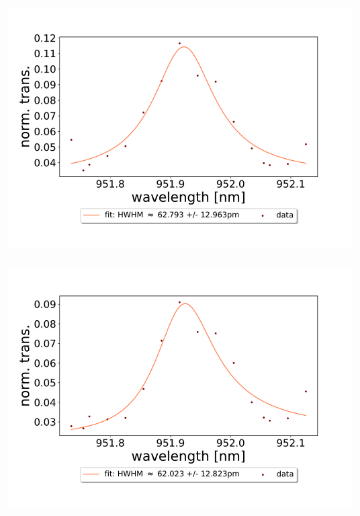 \begin{figure}[h!]
\begin{subfigure}[b]{0.49\textwidth}
        \includegraphics[width=\textwidth]{figures/results/double fano fits/20250326/33um_M3:M5_fit_9.pdf}
        \caption{}
        \label{fig:33um_M3:M5_fit_9}
    \end{subfigure}
    \begin{subfigure}[b]{0.49\textwidth}
        \includegraphics[width=\textwidth]{figures/results/double fano fits/20250326/33um_M3:M5_fit_10.pdf}
        \caption{}
        \label{fig:33um_M3:M5_fit_10}
    \end{subfigure}
    \begin{subfigure}[b]{0.49\textwidth}

\end{subfigure}
\end{figure}
